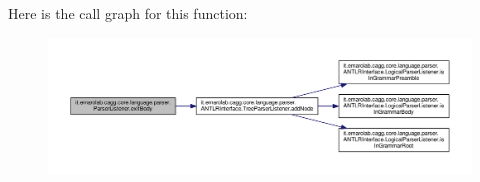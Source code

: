 Here is the call graph for this function\-:\nopagebreak
\begin{figure}[H]
\begin{center}
\leavevmode
\includegraphics[width=350pt]{classit_1_1emarolab_1_1cagg_1_1core_1_1language_1_1parser_1_1ParserListener_a4ddc07fbccb866fee058db32839fba42_cgraph}
\end{center}
\end{figure}


